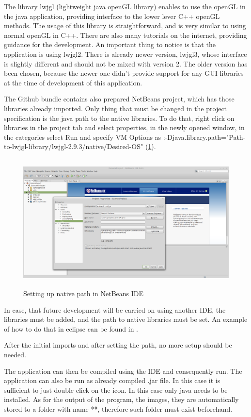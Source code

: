 \documentclass[english,12pt,a4paper,pdftex,elec,utf8]{aaltothesis}
\begin{document}
The library lwjgl (lightweight java openGL library) enables to use the openGL in the java application, providing interface to the lower lever C++ openGL methods. The usage of this library is straightforward, and is very similar to using normal openGL in C++. There are also many tutorials on the internet, providing guidance for the development. An important thing to notice is that the application is using lwjgl2. There is already newer version, lwjgl3, whose interface is slightly different and should not be mixed with version 2. The older version has been chosen, because the newer one didn't provide support for any GUI libraries at the time of development of this application.

The Github bundle contains also prepared NetBeans project, which has those libraries already imported. Only thing that must be changed in the project specification is the java path to the native libraries. To do that, right click on libraries in the project tab and select properties, in the newly opened window, in the categories select Run and specify VM Options as :-Djava.library.path="Path-to-lwjgl-library/lwjgl-2.9.3/native/Desired-OS" (\ref{setUpPaths}).

\begin{figure}[htb]
\centering \includegraphics[height=7cm]{SetUpPaths.png}
\caption{Setting up native path in NetBeans IDE\label{setUpPaths}}
\end{figure}

In case, that future development will be carried on using another IDE, the libraries must be added, and the path to native libraries must be set. An example of how to do that in eclipse can be found in \cite{eclipse}.

After the initial imports and after setting the path, no more setup should be needed. 

The application can then be compiled using the IDE and consequently run.
The application can also be run as already compiled .jar file. In this case it is sufficient to just double click on the icon. In this case only java needs to be installed. As for the output of the program, the images, they are automatically stored to a folder with name **, therefore such folder must exist beforehand.
\end{document}
